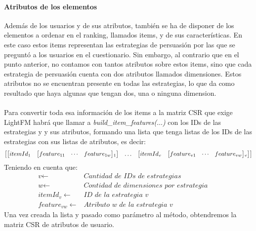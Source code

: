 \paragraph{Atributos de los elementos}
Además de los usuarios y de sus atributos, también se ha de disponer de los elementos a ordenar en el ranking, llamados items, y de sus características. En este caso estos items representan las estrategias de persuasión por las que se preguntó a los usuarios en el cuestionario. Sin embargo, al contrario que en el punto anterior, no contamos con tantos atributos sobre estos items, sino que cada estrategia de persuasión cuenta con dos atributos llamados dimensiones. Estos atributos no se encuentran presente en todas las estrategias, lo que da como resultado que haya algunas que tengan dos, una o ninguna dimension.
\\ \\
Para convertir toda esa información de los items a la matriz CSR que exige LightFM habrá que llamar a \textit{build\_item\_features($\ldots$)} con los IDs de las estrategias y y sus atributos, formando una lista que tenga listas de los IDs de las estrategias con sus listas de atributos, es decir:
\begin{align*}
    \begin{bmatrix}
        \begin{bmatrix} 
            itemId$$_{1}$$ & \begin{bmatrix} feature$$_{11}$$ &\cdots & feature$$_{1w}$$ \end{bmatrix}$$_1$$
        \end{bmatrix}
        &
        \ldots
        &
        \begin{bmatrix} 
            itemId$$_{v}$$ & \begin{bmatrix} feature$$_{v1}$$ &\cdots & feature$$_{vw}$$ \end{bmatrix}$$_v$$
        \end{bmatrix}
    \end{bmatrix}
\end{align*}
Teniendo en cuenta que:
\begin{align*}
    \textit{v}\gets & \textit{Cantidad de IDs de estrategias }
    &&\\
    \textit{w} \gets & \textit{Contidad de dimensiones por estrategia}
    &&\\
    \textit{itemId$_{v}$} \gets & \textit{ID de la estrategia v}
    &&\\
    \textit{feature$_{vw}$} \gets & \textit{Atributo w de la estrategia v}
\end{align*}
%
Una vez creada la lista y pasado como parámetro al método, obtendremos la matriz CSR de atributos de usuario.
%
%
